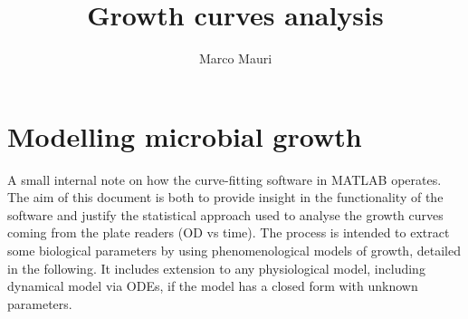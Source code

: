 \documentclass{article}
\title{Growth curves analysis}
\author{Marco Mauri}
\begin{document}
\maketitle

\section{Modelling microbial growth}
A small internal note on how the curve-fitting software in MATLAB operates. The aim of this document is both to provide insight in the functionality of the software and justify the statistical approach used to analyse the growth curves coming from the plate readers (OD vs time). The process is intended to extract some biological parameters by using phenomenological models of growth, detailed in the following. It includes extension to any physiological model, including dynamical model via ODEs, if the model has a closed form with unknown parameters.
\end{document}

